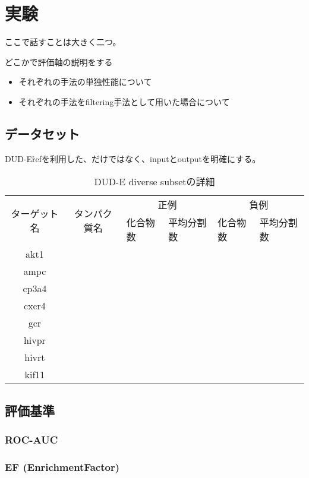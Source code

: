 \chapter{実験}

ここで話すことは大きく二つ。

どこかで評価軸の説明をする
\begin{itemize}
\item それぞれの手法の単独性能について
\item それぞれの手法をfiltering手法として用いた場合について
\end{itemize}
\section{データセット}
DUD-E\r{ref}を利用した、だけではなく、inputとoutputを明確にする。
\begin{table}[htb] \centering
	\caption{DUD-E diverse subsetの詳細}
	\label{tb:dude_divset}
	\begin{tabular}{c|c|ll|ll|}
	\multirow{2}{*}{ターゲット名}	&\multirow{2}{*}{タンパク質名}	&\multicolumn{2}{c}{正例}	&\multicolumn{2}{c}{負例}	\\
							&							&化合物数	&平均分割数	&化合物数	&平均分割数	\\ \hline
	akt1						&							&			&			&			&			\\
	ampc					&							&			&			&			&			\\
	cp3a4					&							&			&			&			&			\\
	cxcr4					&							&			&			&			&			\\
	gcr						&							&			&			&			&			\\
	hivpr					&							&			&			&			&			\\
	hivrt						&							&			&			&			&			\\
	kif11						&							&			&			&			&			\\ \hline
	\end{tabular}
\end{table}
\section{評価基準}
\subsection{ROC-AUC}
\subsection{EF (EnrichmentFactor)}
